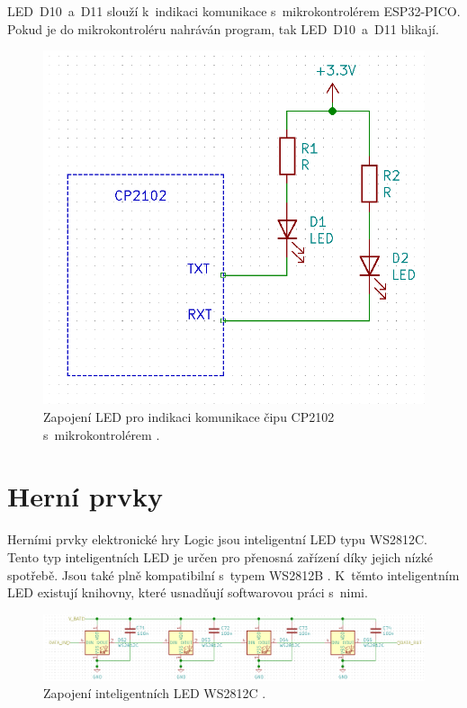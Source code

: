   LED~D10~a~D11 slouží k~indikaci komunikace s~mikrokontrolérem ESP32-PICO. Pokud je do mikrokontroléru nahráván program, tak LED~D10~a~D11 
  blikají.

  \begin{figure}[!h]
      \begin{center}
        \includegraphics[scale=0.5]{obrazky/CP2102_LED.png}
      \end{center}
      \caption[Zapojení LED pro indikaci komunikace čipu CP2102 s~mikrokontrolérem \cite{CP2102_datasheet}]{Zapojení LED pro indikaci 
      komunikace čipu CP2102 s~mikrokontrolérem \cite{CP2102_datasheet}.}
  \end{figure}

  \section{Herní prvky}
  Herními prvky elektronické hry Logic jsou inteligentní LED typu WS2812C. Tento typ inteligentních LED je určen pro přenosná 
  zařízení díky jejich nízké spotřebě. Jsou také plně kompatibilní s~typem WS2812B \cite{WS2812C_datasheet}. K~těmto inteligentním LED 
  existují knihovny, které usnadňují softwarovou práci s~nimi.

  \begin{figure}[!h]
    \begin{center}
      \includegraphics[scale=0.5]{obrazky/WS2812C_spojeni.png}
    \end{center}
    \caption[Zapojení inteligentních LED WS2812C \cite{WS2812C_datasheet}]{Zapojení inteligentních LED WS2812C \cite{WS2812C_datasheet}.}
  \end{figure}

